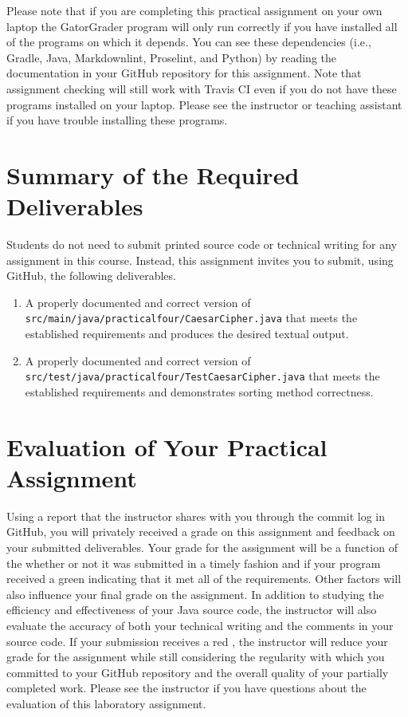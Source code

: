 \documentclass[11pt]{article}
\newcommand{\mainprogramsource}{\lstinline{src/main/java/practicalfour/CaesarCipher.java}}
\newcommand{\testprogramsource}{\lstinline{src/test/java/practicalfour/TestCaesarCipher.java}}
\newcommand{\checkmark}{\ding{51}}
\newcommand{\naughtmark}{\ding{55}}
\begin{document}
Please note that if you are completing this practical assignment on your own
laptop the GatorGrader program will only run correctly if you have installed all
of the programs on which it depends. You can see these dependencies (i.e.,
Gradle, Java, Markdownlint, Proselint, and Python) by reading the documentation
in your GitHub repository for this assignment. Note that assignment checking
will still work with Travis CI even if you do not have these programs installed
on your laptop. Please see the instructor or teaching assistant if you have
trouble installing these programs.

\section*{Summary of the Required Deliverables}

\noindent Students do not need to submit printed source code or technical
writing for any assignment in this course. Instead, this assignment invites you
to submit, using GitHub, the following deliverables.

\begin{enumerate}

  \setlength{\itemsep}{0in}

\item A properly documented and correct version of \mainprogramsource{} that
  meets the established requirements and produces the desired textual output.

\item A properly documented and correct version of \testprogramsource{} that
  meets the established requirements and demonstrates sorting method
  correctness.

\end{enumerate}

\section*{Evaluation of Your Practical Assignment}

Using a report that the instructor shares with you through the commit log in
GitHub, you will privately received a grade on this assignment and feedback on
your submitted deliverables. Your grade for the assignment will be a function of
the whether or not it was submitted in a timely fashion and if your program
received a green \checkmark{} indicating that it met all of the requirements.
Other factors will also influence your final grade on the assignment. In
addition to studying the efficiency and effectiveness of your Java source code,
the instructor will also evaluate the accuracy of both your technical writing
and the comments in your source code. If your submission receives a red
\naughtmark{}, the instructor will reduce your grade for the assignment while
still considering the regularity with which you committed to your GitHub
repository and the overall quality of your partially completed work. Please see
the instructor if you have questions about the evaluation of this laboratory
assignment.
\end{document}
